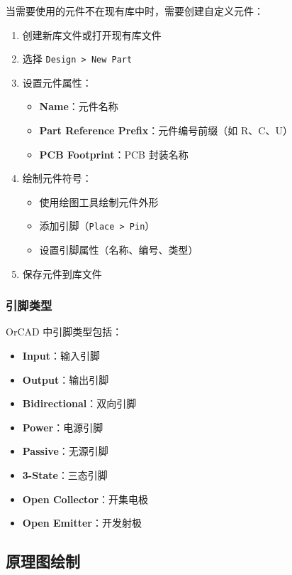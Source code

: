 当需要使用的元件不在现有库中时，需要创建自定义元件：


\begin{enumerate}
  \item 创建新库文件或打开现有库文件
  \item 选择 \lstinline{Design > New Part}
  \item 设置元件属性：
    \begin{itemize}
      \item \textbf{Name}：元件名称
      \item \textbf{Part Reference Prefix}：元件编号前缀（如 R、C、U）
      \item \textbf{PCB Footprint}：PCB 封装名称
    \end{itemize}
  \item 绘制元件符号：
    \begin{itemize}
      \item 使用绘图工具绘制元件外形
      \item 添加引脚（\lstinline{Place > Pin}）
      \item 设置引脚属性（名称、编号、类型）
    \end{itemize}
  \item 保存元件到库文件
\end{enumerate}

\subsubsection{引脚类型}

OrCAD 中引脚类型包括：

\begin{itemize}
  \item \textbf{Input}：输入引脚
  \item \textbf{Output}：输出引脚
  \item \textbf{Bidirectional}：双向引脚
  \item \textbf{Power}：电源引脚
  \item \textbf{Passive}：无源引脚
  \item \textbf{3-State}：三态引脚
  \item \textbf{Open Collector}：开集电极
  \item \textbf{Open Emitter}：开发射极
\end{itemize}

\subsection{原理图绘制}

